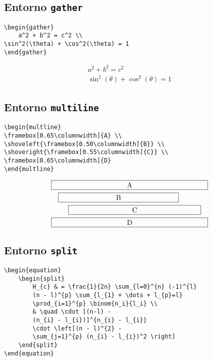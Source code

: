 \documentclass[12pt, a4paper]{article}
\begin{document}
\subsection{Entorno \texttt{gather}}
\begin{verbatim}
\begin{gather}
    a^2 + b^2 = c^2 \\
\sin^2(\theta) + \cos^2(\theta) = 1
\end{gather}
\end{verbatim}

\begin{gather}
    a^2 + b^2 = c^2 \\
\sin^2(\theta) + \cos^2(\theta) = 1
\end{gather}


\subsection{Entorno \texttt{multiline}}
\begin{verbatim}
\begin{multline}
\framebox[0.65\columnwidth]{A} \\
\shoveleft{\framebox[0.50\columnwidth]{B}} \\
\shoveright{\framebox[0.55\columnwidth]{C}} \\
\framebox[0.65\columnwidth]{D}
\end{multline}
\end{verbatim}


\begin{multline}
\framebox[0.65\columnwidth]{A} \\
\shoveleft{\framebox[0.50\columnwidth]{B}} \\ 
\shoveright{\framebox[0.55\columnwidth]{C}} \\
\framebox[0.65\columnwidth]{D}
\end{multline} 

\subsection{Entorno \texttt{split}}
\begin{verbatim}
\begin{equation}
    \begin{split}
        H_{c} & = \frac{1}{2n} \sum_{l=0}^{n} (-1)^{l}
        (n - l)^{p} \sum_{l_{1} + \dots + l_{p}=l}
        \prod_{i=1}^{p} \binom{n_i}{l_i} \\
        & \quad \cdot [(n-l) - 
        (n_{i} - l_{i})]^{n_{i} - l_{i}}
        \cdot \left[(n - l)^{2} - 
        \sum_{j=1}^{p} (n_{i} - l_{i})^2 \right]
    \end{split}
\end{equation}
\end{verbatim}
\end{document}
